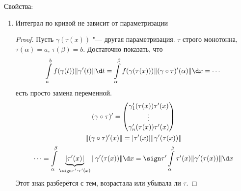 Свойства:
\begin{enumerate}
\item
	Интеграл по кривой не зависит от параметризации
	\begin{proof}
		Пусть $\gamma(\tau(x))$ "--- другая параметризация. $\tau$ строго монотонна, $\tau(\alpha) = a$, $\tau(\beta) = b$.
		Достаточно показать, что
		\[
			\int\limits_a^b f(\gamma(t)) \|\gamma'(t)\| \d t
			= \int\limits_\alpha^\beta f(\gamma(\tau(x))) \|(\gamma \circ \tau)'(\alpha)\| \d x
			= \cdots
		\]
		есть просто замена переменной.
		\begin{gather*}
			(\gamma \circ \tau)' = \begin{pmatrix}
				\gamma_1'(\tau(x)) \tau'(x) \\
				\vdots \\
				\gamma_n'(\tau(x)) \tau'(x)
			\end{pmatrix} \\
			\|(\gamma \circ \tau)'(x)\| = |\tau'(x)| \|\gamma'(\tau(x))\| \\
			\cdots = \int\limits_\alpha^\beta \underbrace{|\tau'(x)|}_{\sign \tau' \cdot \tau'(x)} \|\gamma'(\tau(x))\| \d x
			= \sign \tau' \int\limits_\alpha^\beta \tau'(x) \|\gamma'(\tau(x))\| \d x
		\end{gather*}
		Этот знак разберётся с тем, возрастала или убывала ли $\tau$.
	\end{proof}
\end{enumerate}
